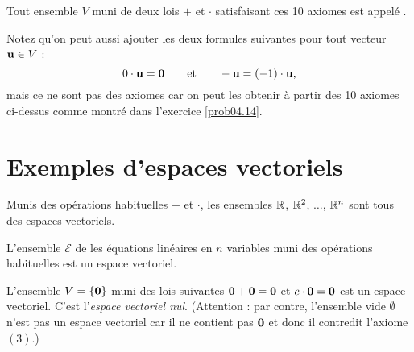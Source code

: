 \begin{definition}
Tout ensemble $V$ muni de deux lois $+$ et $\cdot$ satisfaisant ces 10 axiomes est
appelé .
\end{definition}

Notez qu'on peut aussi ajouter les deux formules suivantes pour tout vecteur $\mathbf{u}\in V$ :
$$0\cdot\mathbf{u} = \mathbf{0} \quad\quad\text{et}\quad\quad -\mathbf{u} = (-1)\cdot\mathbf{u},$$
mais ce ne sont pas des axiomes car on peut les obtenir à partir des 10 axiomes ci-dessus comme montré dans l'exercice \ref{prob04.14}.
 



\section{Exemples d'espaces vectoriels}

\begin{myexample} Munis des opérations habituelles $+$ et $\cdot$, les ensembles $\mathbb{R}$, $\mathbb{R}^2$, $\ldots$, $\mathbb{R}^n$ sont tous des espaces vectoriels. \end{myexample}

\begin{myexample} L'ensemble $\mathcal{E}$ de  les équations linéaires en $n$ variables muni des opérations habituelles est un espace vectoriel. \end{myexample}

\begin{myexample} L'ensemble $V = \{\mathbf{0}\}$ muni des lois suivantes 
$\mathbf{0} + \mathbf{0} = \mathbf{0}$ et $c \cdot \mathbf{0} = \mathbf{0}$  est un espace vectoriel. C'est l'\emph{espace vectoriel nul}.
 (Attention : par contre, l'ensemble vide $\emptyset$ n'est pas un espace vectoriel car il ne contient pas $\mathbf{0}$ et donc il contredit l'axiome $(3)$.) \end{myexample}

